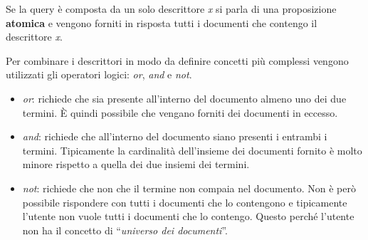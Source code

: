 Se la query è composta da un solo descrittore \textit{x} si parla di una proposizione \textbf{atomica} e vengono forniti in risposta tutti i documenti che contengo il descrittore \textit{x}.

Per combinare i descrittori in modo da definire concetti più complessi vengono utilizzati gli operatori logici: \textit{or}, \textit{and} e \textit{not}.

\begin{itemize}
	\item \textit{or}: richiede che sia presente all'interno del documento almeno uno dei due termini. \`{E} quindi possibile che vengano forniti dei documenti in eccesso.
	\item \textit{and}: richiede che all'interno del documento siano presenti i entrambi i termini. Tipicamente la cardinalità dell'insieme dei documenti fornito è molto minore rispetto a quella dei due insiemi dei termini.
	\item \textit{not}: richiede che non che il termine non compaia nel documento. Non è però possibile rispondere con tutti i documenti che lo contengono e tipicamente l'utente non vuole tutti i documenti che lo contengo. Questo perché l'utente non ha il concetto di ``\textit{universo dei documenti}''.
\end{itemize}























